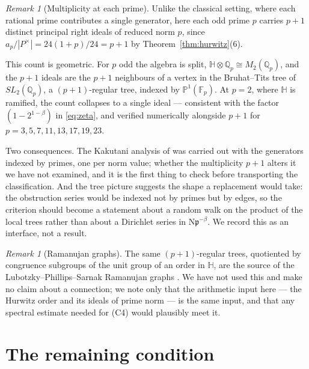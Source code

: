 \documentclass[11pt]{amsart}
\numberwithin{equation}{section}
\theoremstyle{definition}
\theoremstyle{remark}
\newtheorem{remark}[theorem]{Remark}
\newcommand{\Q}{\mathbb{Q}}
\newcommand{\F}{\mathbb{F}}
\newcommand{\HH}{\mathbb{H}}
\newcommand{\pp}{\mathfrak{p}}
\newcommand{\Ns}{\mathrm{N}}
\begin{document}
\begin{remark}[Multiplicity at each prime]\label{rem:mult}
Unlike the classical setting, where each rational prime contributes a single generator, here
each odd prime $p$ carries $p+1$ distinct principal right ideals of reduced norm $p$, since
$a_p/|P^\times|=24(1+p)/24=p+1$ by Theorem~\ref{thm:hurwitz}(6).

This count is geometric. For $p$ odd the algebra is split, $\HH\otimes\Q_p\cong M_2(\Q_p)$,
and the $p+1$ ideals are the $p+1$ neighbours of a vertex in the Bruhat--Tits tree of
$SL_2(\Q_p)$, a $(p+1)$-regular tree, indexed by $\mathbb P^1(\F_p)$. At $p=2$, where $\HH$
is ramified, the count collapses to a single ideal --- consistent with the factor
$(1-2^{1-\beta})$ in \eqref{eq:zeta}, and verified numerically alongside
$p+1$ for $p=3,5,7,11,13,17,19,23$.

Two consequences. The Kakutani analysis of \cite[\S3]{Main} was carried out with the
generators indexed by primes, one per norm value; whether the multiplicity $p+1$ alters it we have not examined, and
it is the first thing to check before transporting the classification. And the tree picture
suggests the shape a replacement would take: the obstruction series would be indexed not by
primes but by edges, so the criterion should become a statement about a random walk on the
product of the local trees rather than about a Dirichlet series in $\Ns\pp^{-\beta}$. We
record this as an interface, not a result.
\end{remark}

\begin{remark}[Ramanujan graphs]\label{rem:ramanujan}
The same $(p+1)$-regular trees, quotiented by congruence subgroups of the unit group of an
order in $\HH$, are the source of the Lubotzky--Phillips--Sarnak Ramanujan graphs
\cite{LPS}. We have
not used this and make no claim about a connection; we note only that the arithmetic input
here --- the Hurwitz order and its ideals of prime norm --- is the same input, and that any
spectral estimate needed for (C4) would plausibly meet it.
\end{remark}

\section{The remaining condition}
\end{document}
